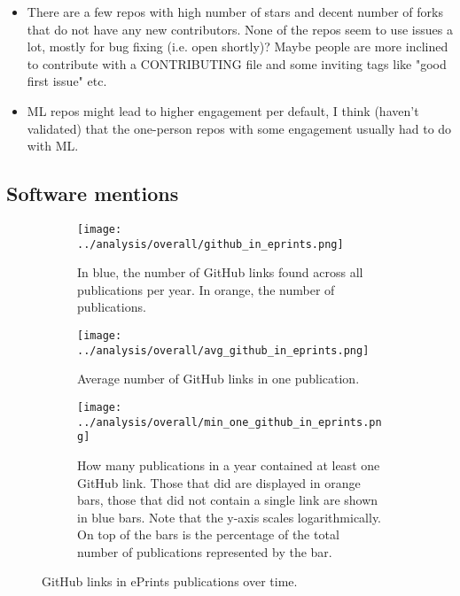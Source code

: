 \documentclass[10pt,a4paper]{scrartcl}
\begin{document}
\begin{itemize}
    \item There are a few repos with high number of stars and decent number of forks that do not have any new contributors. None of the repos seem to use issues a lot, mostly for bug fixing (i.e. open shortly)? Maybe people are more inclined to contribute with a CONTRIBUTING file and some inviting tags like "good first issue" etc.
    \item ML repos might lead to higher engagement per default, I think (haven't validated) that the one-person repos with some engagement usually had to do with ML.
\end{itemize}

\subsection*{Software mentions}

\begin{figure}[h]
    \centering
    \begin{subfigure}[t]{0.3\textwidth}
        \centering
        \texttt{[image: ../analysis/overall/github\_in\_eprints.png]}
        \caption{In blue, the number of GitHub links found across all publications per year. In orange, the number of publications.}
        \label{fig:gh_in_ep_no}
    \end{subfigure}
    \hfill
    \begin{subfigure}[t]{0.3\textwidth}
        \centering
        \texttt{[image: ../analysis/overall/avg\_github\_in\_eprints.png]}
        \caption{Average number of GitHub links in one publication.}
        \label{fig:gh_ep_mean}
    \end{subfigure}
    \hfill
    \begin{subfigure}[t]{0.3\textwidth}
        \centering
        \texttt{[image: ../analysis/overall/min\_one\_github\_in\_eprints.png]}
        \caption{How many publications in a year contained at least one GitHub link.
        Those that did are displayed in orange bars, those that did not contain a single link are shown in blue bars.
        Note that the y-axis scales logarithmically.
        On top of the bars is the percentage of the total number of publications represented by the bar.}
        \label{fig:gh_ep_min_one}
    \end{subfigure}
       \caption{GitHub links in ePrints publications over time.}
       \label{fig:gh_ep}
\end{figure}
\end{document}
